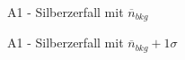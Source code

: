 \documentclass{article}
\begin{document}
\begin{figure}[!h]
    \centering
    \caption{A1 - Silberzerfall mit $\overline{n}_{bkg}$}
    \label{fig:A1-SmUG}
\end{figure}

\begin{figure}[!h]
    \centering
    \caption{A1 - Silberzerfall mit $\overline{n}_{bkg} + 1\sigma$}
    \label{fig:A1-SmUG+1}
\end{figure}
\end{document}
